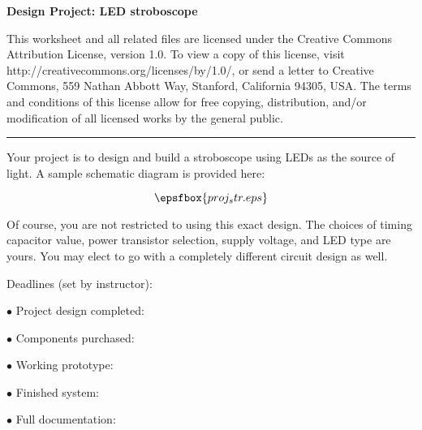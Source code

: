 
\centerline{\bf Design Project: LED stroboscope} \bigskip 
 
This worksheet and all related files are licensed under the Creative Commons Attribution License, version 1.0.  To view a copy of this license, visit http://creativecommons.org/licenses/by/1.0/, or send a letter to Creative Commons, 559 Nathan Abbott Way, Stanford, California 94305, USA.  The terms and conditions of this license allow for free copying, distribution, and/or modification of all licensed works by the general public.

\bigskip 

\hrule

\vskip 10pt

Your project is to design and build a stroboscope using LEDs as the source of light.  A sample schematic diagram is provided here:

$$\epsfbox{proj_str.eps}$$

Of course, you are not restricted to using this exact design.  The choices of timing capacitor value, power transistor selection, supply voltage, and LED type are yours.  You may elect to go with a completely different circuit design as well.

\vskip 10pt

\noindent
Deadlines (set by instructor):

\medskip
\item{$\bullet$} Project design completed: 
\item{$\bullet$} Components purchased:
\item{$\bullet$} Working prototype:
\item{$\bullet$} Finished system:
\item{$\bullet$} Full documentation:
\medskip



